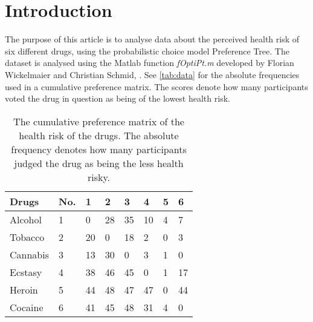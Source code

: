 \section*{Introduction}
\label{Introduktion}
%
The purpose of this article is to analyse data about the perceived health risk of six different drugs, using the probabilistic choice model Preference Tree. The dataset is analysed using the Matlab function \textit{fOptiPt.m} developed by Florian Wickelmaier and Christian Schmid, \parencite{Wickelmaier2004}. See \autoref{tab:data} for the absolute frequencies used in a cumulative preference matrix. The scores denote how many participants voted the drug in question as being of the lowest health risk.
%
\begin{table}[H]
\centering
\begin{tabular}{@{}llllllll@{}}
\toprule
Drugs      & No. & 1  & 2  & 3  & 4  & 5  & 6  \\ \midrule
Alcohol    & 1   & 0  & 28 & 35 & 10 & 4  & 7  \\
Tobacco    & 2   & 20 & 0  & 18 & 2  & 0  & 3  \\
Cannabis   & 3   & 13 & 30 & 0  & 3  & 1  & 0  \\
Ecstasy    & 4   & 38 & 46 & 45 & 0  & 1  & 17 \\
Heroin     & 5   & 44 & 48 & 47 & 47 & 0  & 44 \\
Cocaine    & 6   & 41 & 45 & 48 & 31 & 4  & 0  \\ \bottomrule
\end{tabular}
\caption{The cumulative preference matrix of the health risk of the drugs. The absolute frequency denotes how many participants judged the drug as being the less health risky.}
\label{tab:data}
\end{table} 
